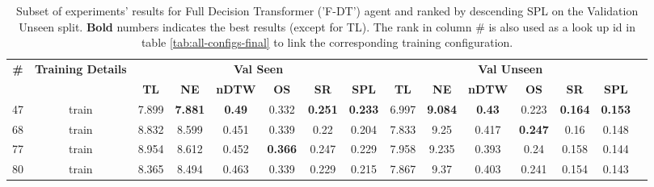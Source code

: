 \begin{table}
\centering
\caption{\label{tab:f_dt_full_dt_ablation_dim}Subset of experiments' results for Full Decision Transformer ('F-DT') agent and ranked by descending SPL on the Validation Unseen split. \textbf{Bold} numbers indicates the best results (except for TL). The rank in column \# is also used as a look up id in table \ref{tab:all-configs-final} to link the corresponding training configuration.}
\begin{tabular}{@{\hskip3pt}c@{\hskip3pt}c@{\hskip3pt}c@{\hskip3pt}c@{\hskip3pt}c@{\hskip3pt}c@{\hskip3pt}c@{\hskip3pt}c@{\hskip3pt}c@{\hskip3pt}c@{\hskip3pt}c@{\hskip3pt}c@{\hskip3pt}c@{\hskip3pt}c@{\hskip3pt}c}
\toprule
                                  \textbf{\#} & \textbf{Training Details} & \multicolumn{6}{c}{\textbf{Val Seen}} & \multicolumn{6}{c}{\textbf{Val Unseen}} \\
\cmidrule(l){3-8}\cmidrule(l){9-14}\textbf{~} &                \textbf{~} &       \textbf{TL} &     \textbf{NE} &  \textbf{nDTW} &     \textbf{OS} &     \textbf{SR} &    \textbf{SPL} &         \textbf{TL} &     \textbf{NE} &  \textbf{nDTW} &     \textbf{OS} &     \textbf{SR} &    \textbf{SPL} \\
\midrule
                                           47 &                     train &             7.899 &  \textbf{7.881} &  \textbf{0.49} &           0.332 &  \textbf{0.251} &  \textbf{0.233} &               6.997 &  \textbf{9.084} &  \textbf{0.43} &           0.223 &  \textbf{0.164} &  \textbf{0.153} \\
                                           68 &                     train &             8.832 &           8.599 &          0.451 &           0.339 &            0.22 &           0.204 &               7.833 &            9.25 &          0.417 &  \textbf{0.247} &            0.16 &           0.148 \\
                                           77 &                     train &             8.954 &           8.612 &          0.452 &  \textbf{0.366} &           0.247 &           0.229 &               7.958 &           9.235 &          0.393 &            0.24 &           0.158 &           0.144 \\
                                           80 &                     train &             8.365 &           8.494 &          0.463 &           0.339 &           0.229 &           0.215 &               7.867 &            9.37 &          0.403 &           0.241 &           0.154 &           0.143 \\
\bottomrule
\end{tabular}
\end{table}
